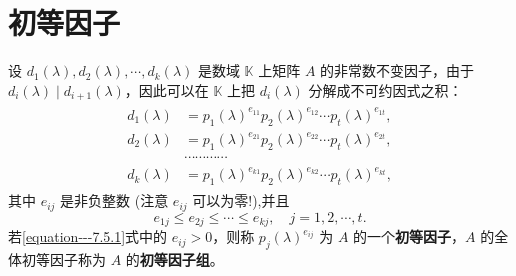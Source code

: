 \documentclass[../../main.tex]{subfiles}
\begin{document}
\section{初等因子}

\begin{definition}[初等因子]
设 $d_1(\lambda),d_2(\lambda),\cdots,d_k(\lambda)$ 是数域 $\mathbb{K}$ 上矩阵 $A$ 的非常数不变因子，由于 $d_i(\lambda)\mid d_{i + 1}(\lambda)$，因此可以在 $\mathbb{K}$ 上把 $d_i(\lambda)$ 分解成不可约因式之积：
\begin{gather}\label{equation---7.5.1}
\begin{aligned}
d_1(\lambda)&=p_1(\lambda)^{e_{11}}p_2(\lambda)^{e_{12}}\cdots p_t(\lambda)^{e_{1t}},\\
d_2(\lambda)&=p_1(\lambda)^{e_{21}}p_2(\lambda)^{e_{22}}\cdots p_t(\lambda)^{e_{2t}},\\
&\cdots\cdots\cdots\cdots\\
d_k(\lambda)&=p_1(\lambda)^{e_{k1}}p_2(\lambda)^{e_{k2}}\cdots p_t(\lambda)^{e_{kt}},
\end{aligned}
\end{gather}
其中 $e_{ij}$ 是非负整数 (注意 $e_{ij}$ 可以为零!),并且
\[
e_{1j}\leq e_{2j}\leq\cdots\leq e_{kj},\quad j = 1, 2, \cdots, t.
\]
若\eqref{equation---7.5.1}式中的 $e_{ij}>0$，则称 $p_j(\lambda)^{e_{ij}}$ 为 $A$ 的一个\textbf{初等因子}，$A$ 的全体初等因子称为 $A$ 的\textbf{初等因子组}。 
\end{definition}
\end{document}
